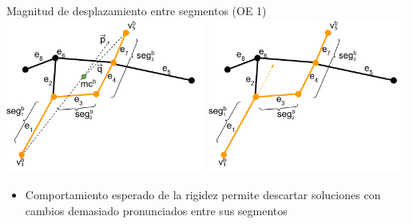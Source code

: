 \begin{frame}{Magnitud de desplazamiento entre segmentos (OE 1)}
    \centering
    \includegraphics[height=2in]{Pictures/ant_segmentMagnitude_case.png}
    \hspace{0.2cm}
    \includegraphics[height=2in]{Pictures/ant_segmentMagnitude_case_2.png}
    \begin{itemize}
        \item Comportamiento esperado de la rigidez permite descartar soluciones con cambios demasiado pronunciados entre sus segmentos
    \end{itemize}
\end{frame}

